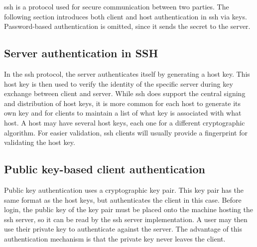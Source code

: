 \gls{ssh} is a protocol used for secure communication between two parties.
The following section introduces both client and host authentication in \gls{ssh} via keys.
Password-based authentication is omitted, since it sends the secret to the server.
\parencite{sshauthrfc, ssharchitecturerfc}

\subsection{Server authentication in SSH}
In the \gls{ssh} protocol, the server authenticates itself by generating a host key.
This host key is then used to verify the identity of the specific server during key exchange between client and server.
While \gls{ssh} does support the central signing and distribution of host keys, it is more common for each host to generate its own key and for clients to maintain a list of what key is associated with what host.
A host may have several host keys, each one for a different cryptographic algorithm.
For easier validation, \gls{ssh} clients will usually provide a fingerprint for validating the host key.
\parencite{ssharchitecturerfc, sshauthrfc}

\subsection{Public key-based client authentication}
Public key authentication uses a cryptographic key pair.
This key pair has the same format as the host keys, but authenticates the client in this case.
Before login, the public key of the key pair must be placed onto the machine hosting the \gls{ssh} server, so it can be read by the \gls{ssh} server implementation.
A user may then use their private key to authenticate against the server.
The advantage of this authentication mechanism is that the private key never leaves the client.
\parencite{sshauthrfc, ssharchitecturerfc}
